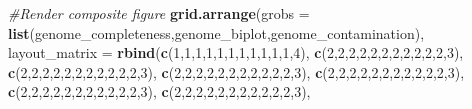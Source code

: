 \documentclass[
]{book}
\newenvironment{Shaded}{\begin{snugshade}}{\end{snugshade}}
\newcommand{\AttributeTok}[1]{\textcolor[rgb]{0.13,0.29,0.53}{#1}}
\newcommand{\CommentTok}[1]{\textcolor[rgb]{0.56,0.35,0.01}{\textit{#1}}}
\newcommand{\DecValTok}[1]{\textcolor[rgb]{0.00,0.00,0.81}{#1}}
\newcommand{\FunctionTok}[1]{\textcolor[rgb]{0.13,0.29,0.53}{\textbf{#1}}}
\newcommand{\NormalTok}[1]{#1}
\begin{document}
\begin{Shaded}
\begin{Highlighting}[]
\CommentTok{\#Render composite figure}
\FunctionTok{grid.arrange}\NormalTok{(}\AttributeTok{grobs =} \FunctionTok{list}\NormalTok{(genome\_completeness,genome\_biplot,genome\_contamination),}
        \AttributeTok{layout\_matrix =} \FunctionTok{rbind}\NormalTok{(}\FunctionTok{c}\NormalTok{(}\DecValTok{1}\NormalTok{,}\DecValTok{1}\NormalTok{,}\DecValTok{1}\NormalTok{,}\DecValTok{1}\NormalTok{,}\DecValTok{1}\NormalTok{,}\DecValTok{1}\NormalTok{,}\DecValTok{1}\NormalTok{,}\DecValTok{1}\NormalTok{,}\DecValTok{1}\NormalTok{,}\DecValTok{1}\NormalTok{,}\DecValTok{1}\NormalTok{,}\DecValTok{4}\NormalTok{),}
                              \FunctionTok{c}\NormalTok{(}\DecValTok{2}\NormalTok{,}\DecValTok{2}\NormalTok{,}\DecValTok{2}\NormalTok{,}\DecValTok{2}\NormalTok{,}\DecValTok{2}\NormalTok{,}\DecValTok{2}\NormalTok{,}\DecValTok{2}\NormalTok{,}\DecValTok{2}\NormalTok{,}\DecValTok{2}\NormalTok{,}\DecValTok{2}\NormalTok{,}\DecValTok{2}\NormalTok{,}\DecValTok{3}\NormalTok{),}
                              \FunctionTok{c}\NormalTok{(}\DecValTok{2}\NormalTok{,}\DecValTok{2}\NormalTok{,}\DecValTok{2}\NormalTok{,}\DecValTok{2}\NormalTok{,}\DecValTok{2}\NormalTok{,}\DecValTok{2}\NormalTok{,}\DecValTok{2}\NormalTok{,}\DecValTok{2}\NormalTok{,}\DecValTok{2}\NormalTok{,}\DecValTok{2}\NormalTok{,}\DecValTok{2}\NormalTok{,}\DecValTok{3}\NormalTok{),}
                              \FunctionTok{c}\NormalTok{(}\DecValTok{2}\NormalTok{,}\DecValTok{2}\NormalTok{,}\DecValTok{2}\NormalTok{,}\DecValTok{2}\NormalTok{,}\DecValTok{2}\NormalTok{,}\DecValTok{2}\NormalTok{,}\DecValTok{2}\NormalTok{,}\DecValTok{2}\NormalTok{,}\DecValTok{2}\NormalTok{,}\DecValTok{2}\NormalTok{,}\DecValTok{2}\NormalTok{,}\DecValTok{3}\NormalTok{),}
                              \FunctionTok{c}\NormalTok{(}\DecValTok{2}\NormalTok{,}\DecValTok{2}\NormalTok{,}\DecValTok{2}\NormalTok{,}\DecValTok{2}\NormalTok{,}\DecValTok{2}\NormalTok{,}\DecValTok{2}\NormalTok{,}\DecValTok{2}\NormalTok{,}\DecValTok{2}\NormalTok{,}\DecValTok{2}\NormalTok{,}\DecValTok{2}\NormalTok{,}\DecValTok{2}\NormalTok{,}\DecValTok{3}\NormalTok{),}
                              \FunctionTok{c}\NormalTok{(}\DecValTok{2}\NormalTok{,}\DecValTok{2}\NormalTok{,}\DecValTok{2}\NormalTok{,}\DecValTok{2}\NormalTok{,}\DecValTok{2}\NormalTok{,}\DecValTok{2}\NormalTok{,}\DecValTok{2}\NormalTok{,}\DecValTok{2}\NormalTok{,}\DecValTok{2}\NormalTok{,}\DecValTok{2}\NormalTok{,}\DecValTok{2}\NormalTok{,}\DecValTok{3}\NormalTok{),}
                              \FunctionTok{c}\NormalTok{(}\DecValTok{2}\NormalTok{,}\DecValTok{2}\NormalTok{,}\DecValTok{2}\NormalTok{,}\DecValTok{2}\NormalTok{,}\DecValTok{2}\NormalTok{,}\DecValTok{2}\NormalTok{,}\DecValTok{2}\NormalTok{,}\DecValTok{2}\NormalTok{,}\DecValTok{2}\NormalTok{,}\DecValTok{2}\NormalTok{,}\DecValTok{2}\NormalTok{,}\DecValTok{3}\NormalTok{),}

\end{Highlighting}
\end{Shaded}
\end{document}

